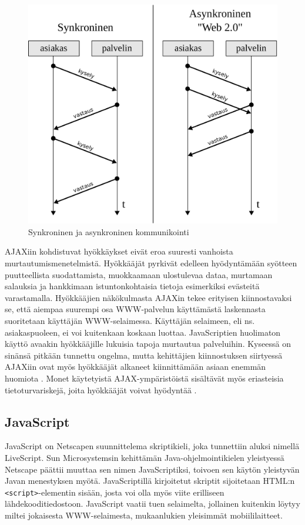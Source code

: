 \begin{figure}[htp]
\centering
\includegraphics[width=12cm]{pics/synkroninen.pdf}
\caption{Synkroninen ja asynkroninen kommunikointi}
\label{synkroninen}
\end{figure}

AJAXiin kohdistuvat hyökkäykset eivät eroa suuresti vanhoista murtautumismenetelmistä. Hyökkääjät pyrkivät edelleen hyödyntämään syötteen puutteellista suodattamista, muokkaamaan 
ulostulevaa dataa, murtamaan salauksia ja hankkimaan istuntonkohtaisia tietoja esimerkiksi evästeitä varastamalla. Hyökkääjien näkökulmasta AJAXin tekee erityisen kiinnostavaksi se,
että aiempaa suurempi osa WWW-palvelun käyttämästä laskennasta suoritetaan käyttäjän WWW-selaimessa. Käyttäjän selaimeen, eli ns. asiakaspuoleen, ei voi kuitenkaan koskaan luottaa.
JavaScriptien huolimaton käyttö avaakin hyökkääjille lukuisia tapoja murtautua palveluihin. Kyseessä on sinänsä pitkään tunnettu ongelma, mutta kehittäjien kiinnostuksen siirtyessä 
AJAXiin ovat myös hyökkääjät alkaneet kiinnittämään asiaan enemmän huomiota \cite{AJAX}. Monet käytetyistä AJAX-ympäristöistä sisältävät myös eriasteisia tietoturvariskejä, joita 
hyökkääjät voivat hyödyntää \cite{JSH}.

\subsection{JavaScript}

JavaScript on Netscapen suunnittelema skriptikieli, joka tunnettiin aluksi nimellä LiveScript. Sun Microsystemsin kehittämän Java-ohjelmointikielen yleistyessä Netscape päättii muuttaa
sen nimen JavaScriptiksi, toivoen sen käytön yleistyvän Javan menestyksen myötä. JavaScriptillä kirjoitetut skriptit sijoitetaan HTML:n \texttt{<script>}-elementin sisään, josta voi 
olla myös viite erilliseen lähdekooditiedostoon. JavaScript vaatii tuen selaimelta, jollainen kuitenkin löytyy miltei jokaisesta WWW-selaimesta, mukaanlukien yleisimmät mobiililaitteet.

